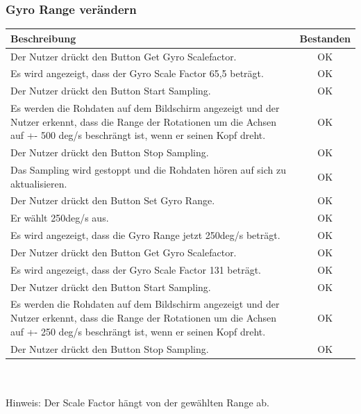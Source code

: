 \documentclass[a4paper,12pt]{article}
\newcommand{\testok}[0]{
	\cellcolor{green!25} OK
}
\begin{document}
\subsubsection{Gyro Range verändern}
\begin{tabular}{ | p{12cm} | c| }
	\hline
	\textbf{Beschreibung} & \textbf{Bestanden}\\
	\hline
	Der Nutzer drückt den Button \glqq{}Get Gyro Scalefactor\grqq{}. & \testok \\
	\hline
	Es wird angezeigt, dass der Gyro Scale Factor 65,5 beträgt. & \testok \\
	\hline
	Der Nutzer drückt den Button \glqq{}Start Sampling\grqq{}. & \testok \\
	\hline
	Es werden die Rohdaten auf dem Bildschirm angezeigt und der Nutzer erkennt, dass die Range der Rotationen um die Achsen auf +- 500 deg/s beschrängt ist, wenn er seinen Kopf dreht. & \testok \\
	\hline
	Der Nutzer drückt den Button \glqq{}Stop Sampling\grqq{}. & \testok \\
	\hline
	Das Sampling wird gestoppt und die Rohdaten hören auf sich zu aktualisieren. & \testok \\
	\hline
	Der Nutzer drückt den Button \glqq{}Set Gyro Range\grqq{}. & \testok \\
	\hline
	Er wählt 250deg/s aus. & \testok \\
	\hline
	Es wird angezeigt, dass die Gyro Range jetzt 250deg/s beträgt. & \testok \\
	\hline
	Der Nutzer drückt den Button \glqq{}Get Gyro Scalefactor\grqq{}. & \testok \\
	\hline
	Es wird angezeigt, dass der Gyro Scale Factor 131 beträgt. & \testok \\
	\hline
	Der Nutzer drückt den Button \glqq{}Start Sampling\grqq{}. & \testok \\
	\hline
	Es werden die Rohdaten auf dem Bildschirm angezeigt und der Nutzer erkennt, dass die Range der Rotationen um die Achsen auf +- 250 deg/s beschrängt ist, wenn er seinen Kopf dreht. & \testok \\
	\hline
	Der Nutzer drückt den Button \glqq{}Stop Sampling\grqq{}. & \testok \\
	\hline
\end{tabular}
\\ \\
Hinweis: Der Scale Factor hängt von der gewählten Range ab.
\\ \\ \\ \\
\end{document}
